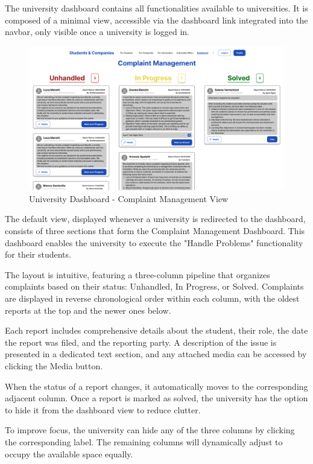 The university dashboard contains all functionalities available to universities. It is composed of a minimal view, accessible via the dashboard link integrated into the navbar, only visible once a university is logged in.

\begin{figure} [H]
    \begin{center}
        \includegraphics[width=0.9\linewidth]{LaTeXCode/images/UI/University Dashboard - Complaint Management View.png}
        \caption{University Dashboard - Complaint Management View}
        \label{fig: dashboard_university_complaint}
    \end{center}
\end{figure}

The default view, displayed whenever a university is redirected to the dashboard, consists of three sections that form the Complaint Management Dashboard. This dashboard enables the university to execute the "Handle Problems" functionality for their students.

The layout is intuitive, featuring a three-column pipeline that organizes complaints based on their status: Unhandled, In Progress, or Solved. Complaints are displayed in reverse chronological order within each column, with the oldest reports at the top and the newer ones below.

Each report includes comprehensive details about the student, their role, the date the report was filed, and the reporting party. A description of the issue is presented in a dedicated text section, and any attached media can be accessed by clicking the Media button.

When the status of a report changes, it automatically moves to the corresponding adjacent column. Once a report is marked as solved, the university has the option to hide it from the dashboard view to reduce clutter.

To improve focus, the university can hide any of the three columns by clicking the corresponding label. The remaining columns will dynamically adjust to occupy the available space equally.
